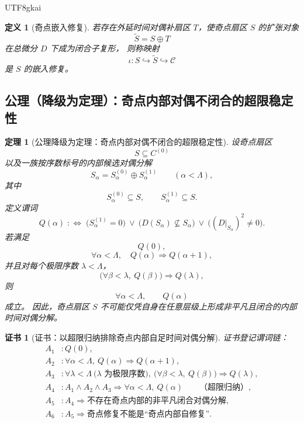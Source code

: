 \documentclass[12pt]{article}
\newtheorem{definition}{定义}[section]
\newtheorem{theorem}{定理}[section]
\newtheorem{Certificate}{证书}[section]
\begin{document}
\begin{CJK*}{UTF8}{gkai}
\begin{definition}[奇点嵌入修复]
\label{def:tex43-singular-embedding-repair}
若存在外延时间对偶补扇区 $T$，使奇点扇区 $S$ 的扩张对象
\[
  \widetilde{S}=S\oplus T
\]
在总微分 $D$ 下成为闭合子复形，
则称映射
\[
  \iota:S\hookrightarrow \widetilde{S}\hookrightarrow \mathcal C
\]
是 $S$ 的\emph{嵌入修复}。
\end{definition}

\subsection{公理（降级为定理）：奇点内部对偶不闭合的超限稳定性}
\label{subsec:tex43-ch7-axiom-downgrade}

\begin{theorem}[公理降级为定理：奇点内部对偶不闭合的超限稳定性]
\label{thm:tex43-singular-dual-failure}
设奇点扇区
\[
  S\subseteq C^{(0)}
\]
以及一族按序数标号的内部候选对偶分解
\[
  S_\alpha=S_\alpha^{(0)}\oplus S_\alpha^{(1)}
  \qquad
  (\alpha<\Lambda),
\]
其中
\[
  S_\alpha^{(0)}\subseteq S,
  \qquad
  S_\alpha^{(1)}\subseteq S.
\]
定义谓词
\[
  Q(\alpha)
  \;:\Longleftrightarrow\;
  \Big(S_\alpha^{(1)}=0\Big)
  \ \vee\
  \Big(D(S_\alpha)\not\subseteq S_\alpha\Big)
  \ \vee\
  \Big((D|_{S_\alpha})^2\neq 0\Big).
\]
若满足
\[
  Q(0),
\]
\[
  \forall \alpha<\Lambda,\quad Q(\alpha)\Rightarrow Q(\alpha+1),
\]
并且对每个极限序数 $\lambda<\Lambda$，
\[
  \Big(\forall \beta<\lambda,\ Q(\beta)\Big)\Rightarrow Q(\lambda),
\]
则
\[
  \forall \alpha<\Lambda,\qquad Q(\alpha)
\]
成立。
因此，奇点扇区 $S$ 不可能仅凭自身在任意层级上形成非平凡且闭合的内部时间对偶分解。
\end{theorem}

\begin{Certificate}[证书：以超限归纳排除奇点内部自足时间对偶分解]
\label{cert:tex43-singular-dual-failure}
证书登记谓词链：
\[
\begin{aligned}
  A_1 &: Q(0),\\
  A_2 &: \forall \alpha<\Lambda,\ Q(\alpha)\Rightarrow Q(\alpha+1),\\
  A_3 &: \forall \lambda<\Lambda\ \big(\lambda\text{ 为极限序数}\big),\
         \Big(\forall \beta<\lambda,\ Q(\beta)\Big)\Rightarrow Q(\lambda),\\
  A_4 &: A_1\wedge A_2\wedge A_3 \Rightarrow
         \forall \alpha<\Lambda,\ Q(\alpha)\qquad\text{（超限归纳）},\\
  A_5 &: A_4 \Rightarrow
         \text{不存在奇点内部的非平凡闭合对偶分解},\\
  A_6 &: A_5 \Rightarrow
         \text{奇点修复不能是“奇点内部自修复”}.
\end{aligned}
\]
\end{Certificate}


\end{CJK*}
\end{document}
